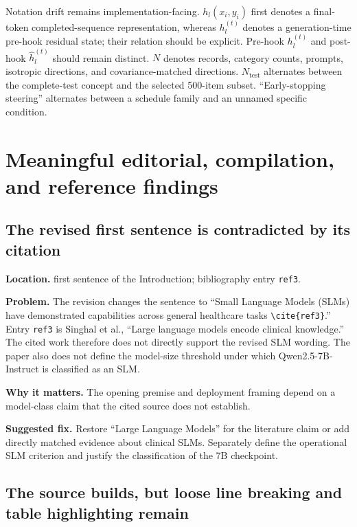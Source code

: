 \documentclass[11pt]{article}
\newcommand{\findinglabel}[1]{\textbf{#1}}
\begin{document}
Notation drift remains implementation-facing.  $h_l(x_i,y_i)$ first denotes a final-token completed-sequence representation, whereas $h_l^{(t)}$ denotes a generation-time pre-hook residual state; their relation should be explicit.  Pre-hook $h_l^{(t)}$ and post-hook $\hat h_l^{(t)}$ should remain distinct.  $N$ denotes records, category counts, prompts, isotropic directions, and covariance-matched directions.  $N_{\text{test}}$ alternates between the complete-test concept and the selected 500-item subset.  ``Early-stopping steering'' alternates between a schedule family and an unnamed specific condition.

\section*{Meaningful editorial, compilation, and reference findings}

\subsection*{The revised first sentence is contradicted by its citation}

\findinglabel{Location.} first sentence of the Introduction; bibliography entry \texttt{ref3}.

\findinglabel{Problem.} The revision changes the sentence to ``Small Language Models (SLMs) have demonstrated capabilities across general healthcare tasks \texttt{\textbackslash cite\{ref3\}}.''  Entry \texttt{ref3} is Singhal et al., ``Large language models encode clinical knowledge.''  The cited work therefore does not directly support the revised SLM wording.  The paper also does not define the model-size threshold under which Qwen2.5-7B-Instruct is classified as an SLM.

\findinglabel{Why it matters.} The opening premise and deployment framing depend on a model-class claim that the cited source does not establish.

\findinglabel{Suggested fix.} Restore ``Large Language Models'' for the literature claim or add directly matched evidence about clinical SLMs.  Separately define the operational SLM criterion and justify the classification of the 7B checkpoint.

\subsection*{The source builds, but loose line breaking and table highlighting remain}
\end{document}
